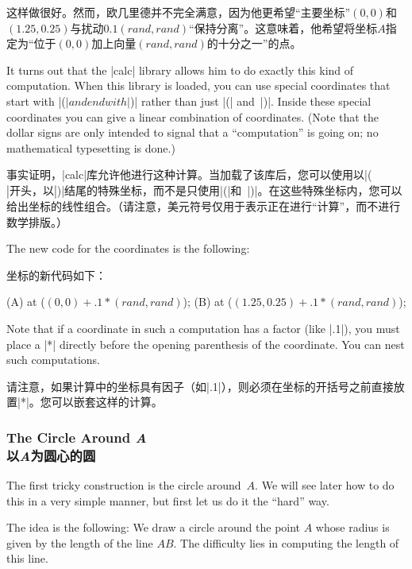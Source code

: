 这样做很好。然而，欧几里德并不完全满意，因为他更希望“主要坐标”$(0,0)$和$(1.25,0.25)$与扰动$0.1(\mathit{rand},\mathit{rand})$“保持分离”。这意味着，他希望将坐标$A$指定为“位于$(0,0)$加上向量$(\mathit{rand},\mathit{rand})$的十分之一”的点。

It turns out that the |calc| library allows him to do exactly this kind of
computation. When this library is loaded, you can use special coordinates that
start with |($| and end with |$)| rather than just |(| and~|)|. Inside these
special coordinates you can give a linear combination of coordinates. (Note
that the dollar signs are only intended to signal that a ``computation'' is
going on; no mathematical typesetting is done.)

事实证明，|calc|库允许他进行这种计算。当加载了该库后，您可以使用以|($|开头，以|$)|结尾的特殊坐标，而不是只使用|(|和~|)|。在这些特殊坐标内，您可以给出坐标的线性组合。（请注意，美元符号仅用于表示正在进行“计算”，而不进行数学排版。）

The new code for the coordinates is the following:

坐标的新代码如下：
%
\begin{codeexample}
\coordinate [...] (A) at ($ (0,0) + .1*(rand,rand) $);
\coordinate [...] (B) at ($ (1.25,0.25) + .1*(rand,rand) $);
\end{codeexample}

Note that if a coordinate in such a computation has a factor (like |.1|), you
must place a |*| directly before the opening parenthesis of the coordinate. You
can nest such computations.

请注意，如果计算中的坐标具有因子（如|.1|），则必须在坐标的开括号之前直接放置|*|。您可以嵌套这样的计算。



\subsubsection{The Circle Around \emph{A}\\以\emph{A}为圆心的圆}

The first tricky construction is the circle around~$A$. We will see later how
to do this in a very simple manner, but first let us do it the ``hard'' way.

The idea is the following: We draw a circle around the point $A$ whose radius
is given by the length of the line $AB$. The difficulty lies in computing the
length of this line.

